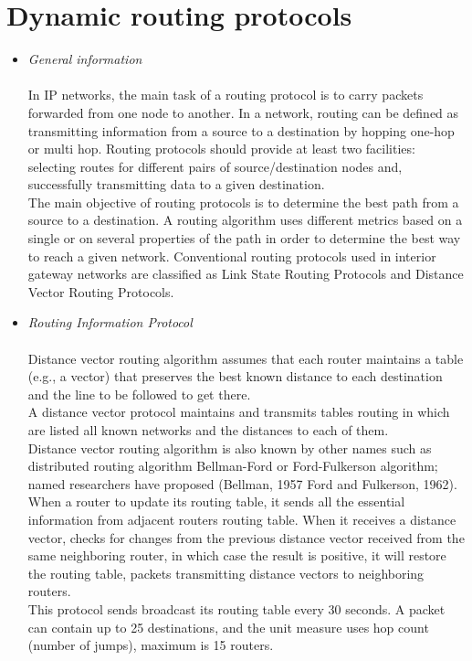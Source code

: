 \documentclass[conference,compsoc]{IEEEtran}
\begin{document}
\section{Dynamic routing protocols}
\begin{itemize}
\item 
\emph{General information}\\\\
In IP networks, the main task of a routing protocol is to carry packets forwarded from one node to another. In a network, routing can be defined as transmitting information from a source to a destination by hopping one-hop or multi hop. Routing protocols should provide at least two facilities: selecting routes for different pairs of source/destination nodes and, successfully transmitting data to a given destination.
\\ The main objective of routing protocols is to determine the best path from a source to a destination. A routing algorithm uses different metrics based on a single or on several properties of the path in order to determine the best way to reach a given network. Conventional routing protocols used in interior gateway networks are classified as Link State Routing Protocols and Distance Vector Routing Protocols.\\

\item
\emph{Routing Information Protocol}\\\\
Distance vector routing algorithm assumes that each router maintains a table (e.g., a vector) that preserves the best known distance to each destination and the line to be followed to get there.
\\ A distance vector protocol maintains and transmits tables routing in which are listed all known networks and the distances to each of them.
\\ Distance vector routing algorithm is also known by other names such as distributed routing algorithm Bellman-Ford or Ford-Fulkerson algorithm; named researchers have proposed (Bellman, 1957 Ford and Fulkerson, 1962). When a router to update its routing table, it sends all the essential information from adjacent routers routing table. When it receives a distance vector, checks for changes from the previous distance vector received from the same neighboring router, in which case the result is positive, it will restore the routing table, packets transmitting distance vectors to neighboring routers.
\\ This protocol sends broadcast its routing table every 30 seconds. A packet can contain up to 25 destinations, and the unit measure uses hop count (number of jumps), maximum is 15 routers.\\


\end{itemize}
\end{document}
